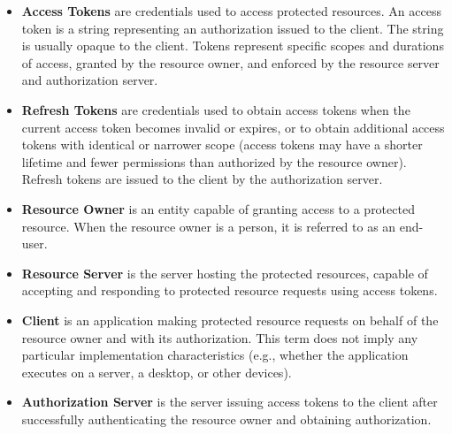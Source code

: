 \begin{itemize}
    \item \textbf{Access Tokens} are credentials used to access protected resources.
    An access token is a string representing an authorization issued to the client.
    The string is usually opaque to the client.
    Tokens represent specific scopes and
    durations of access, granted by the resource owner, and enforced by the resource server and authorization server.
    \item \textbf{Refresh Tokens} are credentials used to obtain access tokens when the current access token becomes
    invalid or expires, or to obtain additional access tokens with identical or narrower scope (access tokens may have a shorter
    lifetime and fewer permissions than authorized by the resource owner).
    Refresh tokens are issued to the client by the authorization server.
    \item \textbf{Resource Owner} is an entity capable of granting access to a protected resource.
    When the resource owner is a person, it is referred to as an end-user.
    \item \textbf{Resource Server} is the server hosting the protected resources, capable of accepting and responding to protected
    resource requests using access tokens.
    \item \textbf{Client} is an application making protected resource requests on behalf of the resource owner and with its authorization.
    This term does not imply any particular implementation characteristics (e.g., whether the application executes on a server,
    a desktop, or other devices).
    \item \textbf{Authorization Server} is the server issuing access tokens to the client after successfully authenticating the resource owner
    and obtaining authorization.
\end{itemize}